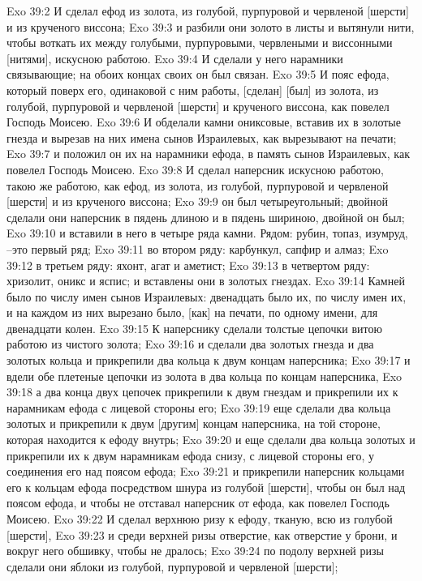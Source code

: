Exo 39:2  И сделал ефод из золота, из голубой, пурпуровой и червленой [шерсти] и из крученого виссона;
Exo 39:3  и разбили они золото в листы и вытянули нити, чтобы воткать их между голубыми, пурпуровыми, червлеными и виссонными [нитями], искусною работою.
Exo 39:4  И сделали у него нарамники связывающие; на обоих концах своих он был связан.
Exo 39:5  И пояс ефода, который поверх его, одинаковой с ним работы, [сделан] [был] из золота, из голубой, пурпуровой и червленой [шерсти] и крученого виссона, как повелел Господь Моисею.
Exo 39:6  И обделали камни ониксовые, вставив их в золотые гнезда и вырезав на них имена сынов Израилевых, как вырезывают на печати;
Exo 39:7  и положил он их на нарамники ефода, в память сынов Израилевых, как повелел Господь Моисею.
Exo 39:8  И сделал наперсник искусною работою, такою же работою, как ефод, из золота, из голубой, пурпуровой и червленой [шерсти] и из крученого виссона;
Exo 39:9  он был четыреугольный; двойной сделали они наперсник в пядень длиною и в пядень шириною, двойной он был;
Exo 39:10  и вставили в него в четыре ряда камни. Рядом: рубин, топаз, изумруд, --это первый ряд;
Exo 39:11  во втором ряду: карбункул, сапфир и алмаз;
Exo 39:12  в третьем ряду: яхонт, агат и аметист;
Exo 39:13  в четвертом ряду: хризолит, оникс и яспис; и вставлены они в золотых гнездах.
Exo 39:14  Камней было по числу имен сынов Израилевых: двенадцать было их, по числу имен их, и на каждом из них вырезано было, [как] на печати, по одному имени, для двенадцати колен.
Exo 39:15  К наперснику сделали толстые цепочки витою работою из чистого золота;
Exo 39:16  и сделали два золотых гнезда и два золотых кольца и прикрепили два кольца к двум концам наперсника;
Exo 39:17  и вдели обе плетеные цепочки из золота в два кольца по концам наперсника,
Exo 39:18  а два конца двух цепочек прикрепили к двум гнездам и прикрепили их к нарамникам ефода с лицевой стороны его;
Exo 39:19  еще сделали два кольца золотых и прикрепили к двум [другим] концам наперсника, на той стороне, которая находится к ефоду внутрь;
Exo 39:20  и еще сделали два кольца золотых и прикрепили их к двум нарамникам ефода снизу, с лицевой стороны его, у соединения его над поясом ефода;
Exo 39:21  и прикрепили наперсник кольцами его к кольцам ефода посредством шнура из голубой [шерсти], чтобы он был над поясом ефода, и чтобы не отставал наперсник от ефода, как повелел Господь Моисею.
Exo 39:22  И сделал верхнюю ризу к ефоду, тканую, всю из голубой [шерсти],
Exo 39:23  и среди верхней ризы отверстие, как отверстие у брони, и вокруг него обшивку, чтобы не дралось;
Exo 39:24  по подолу верхней ризы сделали они яблоки из голубой, пурпуровой и червленой [шерсти];
